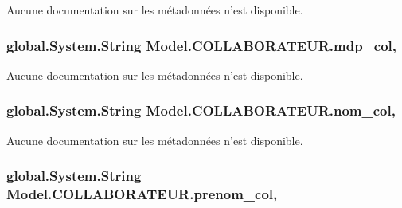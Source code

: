 Aucune documentation sur les métadonnées n'est disponible. 

\hypertarget{class_model_1_1_c_o_l_l_a_b_o_r_a_t_e_u_r_a2099c578d33f2851b0a914aeca8a3234}{
\subsubsection[{mdp\-\_\-col}]{\setlength{\rightskip}{0pt plus 5cm}global.\-System.\-String Model.\-C\-O\-L\-L\-A\-B\-O\-R\-A\-T\-E\-U\-R.\-mdp\-\_\-col\hspace{0.3cm}{\ttfamily [get]}, {\ttfamily [set]}}}\label{class_model_1_1_c_o_l_l_a_b_o_r_a_t_e_u_r_a2099c578d33f2851b0a914aeca8a3234}


Aucune documentation sur les métadonnées n'est disponible. 

\hypertarget{class_model_1_1_c_o_l_l_a_b_o_r_a_t_e_u_r_a16da434fc2d5fd237a9c10011c7240ad}{
\subsubsection[{nom\-\_\-col}]{\setlength{\rightskip}{0pt plus 5cm}global.\-System.\-String Model.\-C\-O\-L\-L\-A\-B\-O\-R\-A\-T\-E\-U\-R.\-nom\-\_\-col\hspace{0.3cm}{\ttfamily [get]}, {\ttfamily [set]}}}\label{class_model_1_1_c_o_l_l_a_b_o_r_a_t_e_u_r_a16da434fc2d5fd237a9c10011c7240ad}


Aucune documentation sur les métadonnées n'est disponible. 

\hypertarget{class_model_1_1_c_o_l_l_a_b_o_r_a_t_e_u_r_a653654accc486107577cbe805db1e1dc}{
\subsubsection[{prenom\-\_\-col}]{\setlength{\rightskip}{0pt plus 5cm}global.\-System.\-String Model.\-C\-O\-L\-L\-A\-B\-O\-R\-A\-T\-E\-U\-R.\-prenom\-\_\-col\hspace{0.3cm}{\ttfamily [get]}, {\ttfamily [set]}}}\label{class_model_1_1_c_o_l_l_a_b_o_r_a_t_e_u_r_a653654accc486107577cbe805db1e1dc}


